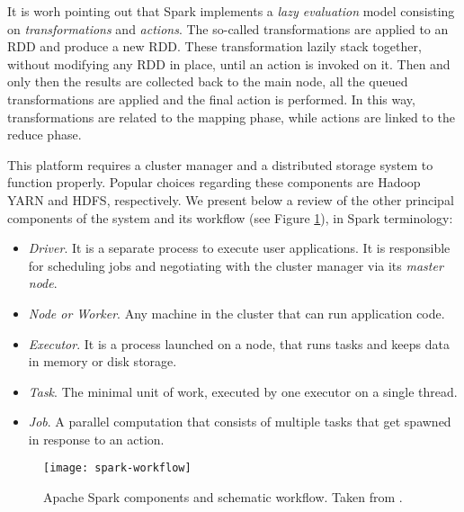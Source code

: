 It is worh pointing out that Spark implements a \textit{lazy evaluation} model consisting on \textit{transformations} and \textit{actions}. The so-called transformations are applied to an RDD and produce a new RDD. These transformation lazily stack together, without modifying any RDD in place, until an action is invoked on it. Then and only then the results are collected back to the main node, all the queued transformations are applied and the final action is performed. In this way, transformations are related to the mapping phase, while actions are linked to the reduce phase.

This platform requires a cluster manager and a distributed storage system to function properly. Popular choices regarding these components are Hadoop YARN and HDFS, respectively. We present below a review of the other principal components of the system and its workflow (see Figure \ref{fig:spark-workflow}), in Spark terminology:

\begin{itemize}
  \item \textit{Driver}. It is a separate process to execute user applications. It is responsible for scheduling jobs and negotiating with the cluster manager via its \textit{master node}.
  \item \textit{Node or Worker}. Any machine in the cluster that can run application code.
  \item \textit{Executor}. It is a process launched on a node, that runs tasks and keeps data in memory or disk storage.
   \item \textit{Task}. The minimal unit of work, executed by one executor on a single thread.
   \item \textit{Job}. A parallel computation that consists of multiple tasks that get spawned in response to an action.
\end{itemize}

\begin{figure}[h!]
  \centering
  \texttt{[image: spark-workflow]}
  \caption{Apache Spark components and schematic workflow. Taken from \cite{lopez2019distributed}.}
  \label{fig:spark-workflow}
\end{figure}
